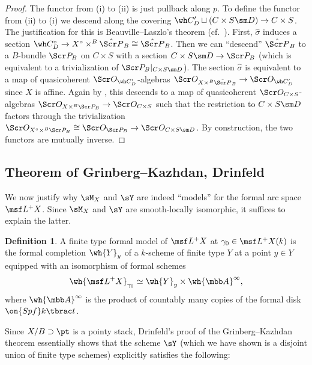 \documentclass[final]{amsart}
\theoremstyle{remark}
\theoremstyle{definition}
\newtheorem{defn}[subsubsection]{Definition}
\numberwithin{equation}{section}
\begin{document}
\begin{proof}
The functor from (i) to (ii) is just pullback along $p$. 
To define the functor from (ii) to (i) we descend along the covering 
$\wh C'_D \sqcup (C\times S \sm D) \to C\times S$. The justification
for this is Beauville--Laszlo's theorem (cf.~\cite[Theorem 2.12.1]{BD}). 
First, $\hat \sigma$ induces 
a section $\wh C^\circ_D \to X^\circ \times^B \hat{\Scr P}_B \cong \hat{\Scr P}_B$.
Then we can ``descend'' $\hat{\Scr P}_B$ to a $B$-bundle $\Scr P_B$ on $C\times S$ with a section $C\times S\sm D \to \Scr P_B$ (which
is equivalent to a trivialization of $\Scr P_B|_{C\times S\sm D}$).
The section $\hat\sigma$ is equivalent to a map of quasicoherent
$\Scr O_{\wh C'_D}$-algebras $\Scr O_{X\times^B \hat{\Scr P}_B} \to \Scr O_{\wh C'_D}$ since $X$ is affine. 
Again by \cite[Theorem 2.12.1]{BD}, this descends 
to a map of quasicoherent $\Scr O_{C\times S}$-algebras $\Scr O_{X\times^B \Scr P_B} \to \Scr O_{C\times S}$ such that the restriction to 
$C\times S\sm D$ factors through the trivialization 
$\Scr O_{X^\circ \times^B \Scr P_B}\cong \Scr O_{\Scr P_B} \to \Scr O_{C\times S\sm D}$.
By construction, the two functors are mutually inverse.
\end{proof}


\subsection{Theorem of Grinberg--Kazhdan, Drinfeld} 

We now justify why $\sM_X$ and $\sY$ are indeed ``models'' for the formal arc space
$\msf L^+ X$. Since $\sM_X$ and $\sY$ are smooth-locally isomorphic,
it suffices to explain the latter. 

\begin{defn}\label{def:formalmodel} 
A finite type formal model of $\msf L^+ X$ at $\gamma_0\in \msf L^+ X(k)$ is the formal completion $\wh{Y}_y$ of a $k$-scheme of finite type $Y$ at a point $y\in Y$ equipped with an isomorphism of formal schemes
\begin{equation} \label{finite model}
\wh{\msf L^+ X}_{\gamma_0} \simeq \wh{Y}_y \times \wh{\mbb A}^\infty,
\end{equation}
where $\wh{\mbb A}^\infty$ is the product of countably many copies of the formal disk $\on{Spf} k\tbrac t$.
\end{defn}


Since $X/B \supset \pt$ is a pointy stack, 
Drinfeld's proof \cite[\S 4.2-4.3]{Drinfeld} of the Grinberg--Kazhdan theorem 
essentially shows that the scheme $\sY$ (which we have shown is a disjoint union
of finite type schemes) explicitly satisfies the following:
\end{document}
